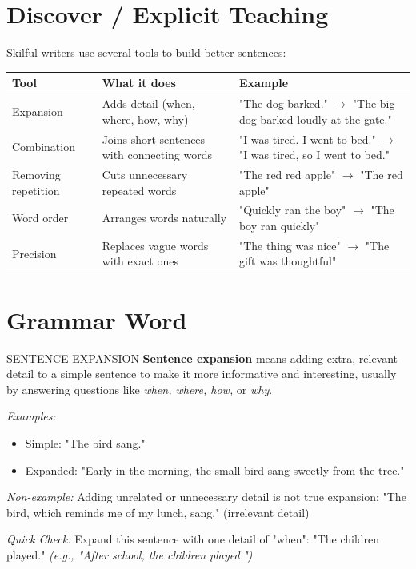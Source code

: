 \section{Discover / Explicit Teaching}
Skilful writers use several tools to build better sentences:

\begin{table}[h!]
\centering
\begin{tabular}{|l|l|l|}
\hline
\textbf{Tool} & \textbf{What it does} & \textbf{Example} \\
\hline
Expansion & Adds detail (when, where, how, why) & "The dog barked." $\rightarrow$ "The big dog barked loudly at the gate." \\
Combination & Joins short sentences with connecting words & "I was tired. I went to bed." $\rightarrow$ "I was tired, so I went to bed." \\
Removing repetition & Cuts unnecessary repeated words & "The red red apple" $\rightarrow$ "The red apple" \\
Word order & Arranges words naturally & "Quickly ran the boy" $\rightarrow$ "The boy ran quickly" \\
Precision & Replaces vague words with exact ones & "The thing was nice" $\rightarrow$ "The gift was thoughtful" \\
\hline
\end{tabular}
\end{table}

\section{Grammar Word}
\begin{grammarword}{SENTENCE EXPANSION}
\textbf{Sentence expansion} means adding extra, relevant detail to a simple sentence to make it more informative and interesting, usually by answering questions like \textit{when, where, how,} or \textit{why}.

\textit{Examples:}
\begin{itemize}
    \item Simple: "The bird sang."
    \item Expanded: "Early in the morning, the small bird sang sweetly from the tree."
\end{itemize}

\textit{Non-example:} Adding unrelated or unnecessary detail is not true expansion: "The bird, which reminds me of my lunch, sang." (irrelevant detail)

\textit{Quick Check:} Expand this sentence with one detail of "when": "The children played." \textit{(e.g., "After school, the children played.")}
\end{grammarword}

